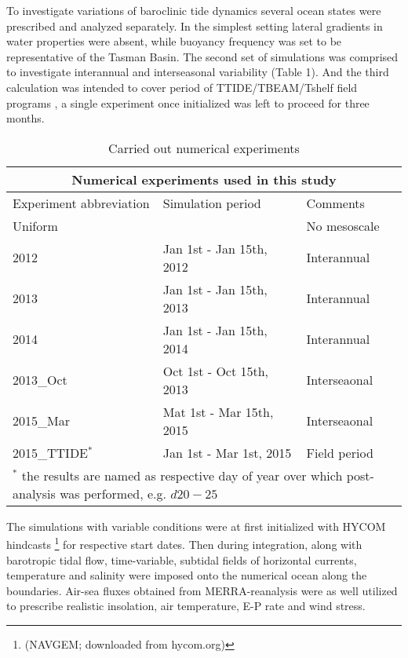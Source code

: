 \documentclass[12pt]{article}
\begin{document}
To investigate variations of baroclinic tide dynamics several ocean states were prescribed and 
analyzed separately. In the simplest setting lateral gradients in water properties were absent, 
while buoyancy frequency was set to be representative of the Tasman Basin. The second set of 
simulations 
was comprised to investigate interannual and interseasonal variability (Table 1). And the third 
calculation was intended to cover period of TTIDE/TBEAM/Tshelf field programs 
\citep{pinkel2015breaking}, a single experiment once initialized was left to proceed for three 
months.
\begin{table}
	\caption{Carried out numerical experiments}
	\begin{tabular}{ |p{3cm}||p{5cm}|p{5cm}|  }
		\hline
		\multicolumn{3}{|c|}{Numerical experiments used in this study} \\
		\hline
		Experiment abbreviation & Simulation period & Comments \\
		\hline
		Uniform & ~ & No mesoscale \\
		2012 &   Jan 1st - Jan 15th, 2012 & Interannual \\
		2013 &   Jan 1st - Jan 15th, 2013 & Interannual \\
		2014 &   Jan 1st - Jan 15th, 2014 & Interannual \\
		2013\_Oct &   Oct 1st - Oct 15th, 2013 & Interseaonal \\
		2015\_Mar &   Mat 1st - Mar 15th, 2015 & Interseaonal \\
		2015\_TTIDE$^{\ast}$ &   Jan 1st - Mar 1st, 2015 & Field period \\
		\hline
		\multicolumn{3}{|l|}{\footnotesize$^{\ast}$ the results are named as respective day of 
		year over which post-analysis was performed, e.g. $d20-25$ }\\
		\hline
	\end{tabular}
	\label{ch2:table_exp}
\end{table}
The simulations with variable conditions were at first initialized with HYCOM hindcasts
\footnote{(NAVGEM;	downloaded from hycom.org)} for respective start dates. Then during 
integration, 
along with barotropic tidal flow, time-variable, subtidal fields 
of horizontal currents, temperature and salinity were imposed onto the numerical ocean along the 
boundaries. Air-sea fluxes obtained from MERRA-reanalysis \citep{rienecker2011merra} were as well 
utilized to prescribe realistic insolation, air temperature, E-P rate and wind stress.
\end{document}
